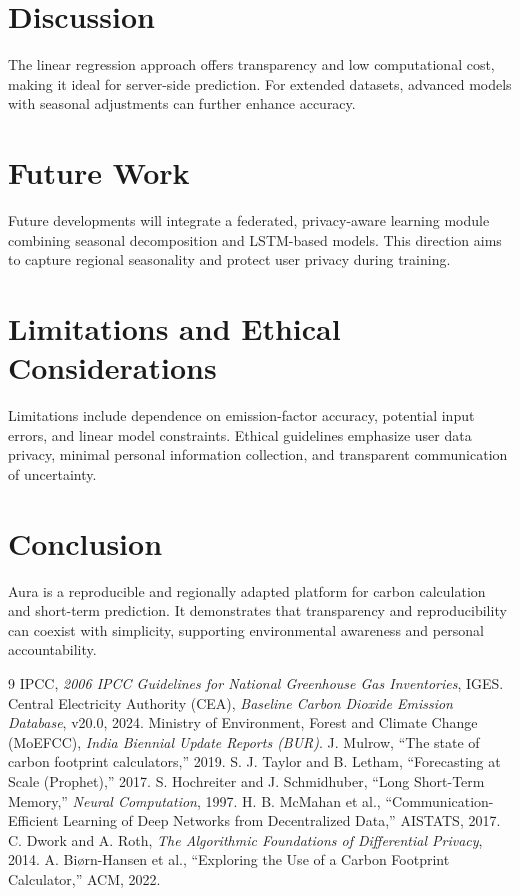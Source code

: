 \documentclass[journal]{IEEEtran}
\begin{document}
\section{Discussion}
The linear regression approach offers transparency and low computational cost, making it ideal for server-side prediction. For extended datasets, advanced models with seasonal adjustments can further enhance accuracy.

\section{Future Work}
Future developments will integrate a federated, privacy-aware learning module combining seasonal decomposition and LSTM-based models. This direction aims to capture regional seasonality and protect user privacy during training.

\section{Limitations and Ethical Considerations}
Limitations include dependence on emission-factor accuracy, potential input errors, and linear model constraints. Ethical guidelines emphasize user data privacy, minimal personal information collection, and transparent communication of uncertainty.

\section{Conclusion}
Aura is a reproducible and regionally adapted platform for carbon calculation and short-term prediction. It demonstrates that transparency and reproducibility can coexist with simplicity, supporting environmental awareness and personal accountability.

\begin{thebibliography}{9}
 IPCC, \emph{2006 IPCC Guidelines for National Greenhouse Gas Inventories}, IGES.
 Central Electricity Authority (CEA), \emph{Baseline Carbon Dioxide Emission Database}, v20.0, 2024.
 Ministry of Environment, Forest and Climate Change (MoEFCC), \emph{India Biennial Update Reports (BUR)}.
 J. Mulrow, ``The state of carbon footprint calculators,'' 2019.
 S. J. Taylor and B. Letham, ``Forecasting at Scale (Prophet),'' 2017.
 S. Hochreiter and J. Schmidhuber, ``Long Short-Term Memory,'' \emph{Neural Computation}, 1997.
 H. B. McMahan et al., ``Communication-Efficient Learning of Deep Networks from Decentralized Data,'' AISTATS, 2017.
 C. Dwork and A. Roth, \emph{The Algorithmic Foundations of Differential Privacy}, 2014.
 A. Biørn-Hansen et al., ``Exploring the Use of a Carbon Footprint Calculator,'' ACM, 2022.
\end{thebibliography}
\end{document}
